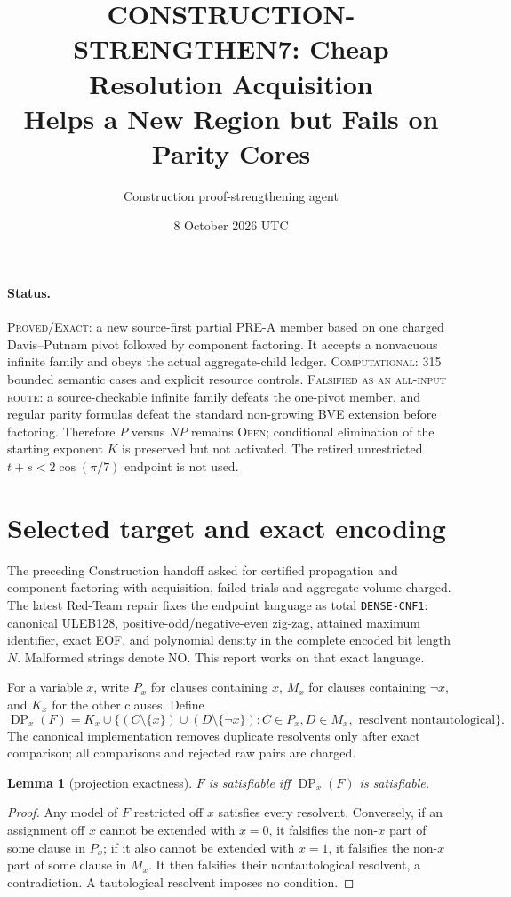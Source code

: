 \documentclass[11pt]{article}
\title{CONSTRUCTION-STRENGTHEN7: Cheap Resolution Acquisition\\Helps a New Region but Fails on Parity Cores}
\author{Construction proof-strengthening agent}
\date{8 October 2026 UTC}
\newtheorem{lemma}[theorem]{Lemma}
\begin{document}
\sloppy\maketitle

\paragraph{Status.}
\textsc{Proved/Exact}: a new source-first partial PRE-A member based on one
charged Davis--Putnam pivot followed by component factoring.  It accepts a
nonvacuous infinite family and obeys the actual aggregate-child ledger.
\textsc{Computational}: 315 bounded semantic cases and explicit resource
controls.  \textsc{Falsified as an all-input route}: a source-checkable
infinite family defeats the one-pivot member, and regular parity formulas
defeat the standard non-growing BVE extension before factoring.  Therefore
$P$ versus $NP$ remains \textsc{Open}; conditional elimination of the
starting exponent $K$ is preserved but not activated.  The retired
unrestricted $t+s<2\cos(\pi/7)$ endpoint is not used.

\section{Selected target and exact encoding}

The preceding Construction handoff asked for certified propagation and
component factoring with acquisition, failed trials and aggregate volume
charged.  The latest Red-Team repair fixes the endpoint language as total
\texttt{DENSE-CNF1}: canonical ULEB128, positive-odd/negative-even zig-zag,
attained maximum identifier, exact EOF, and polynomial density in the
complete encoded bit length $N$.  Malformed strings denote NO.  This report
works on that exact language.

For a variable $x$, write $P_x$ for clauses containing $x$, $M_x$ for
clauses containing $\neg x$, and $K_x$ for the other clauses.  Define
\[
 \operatorname{DP}_x(F)=K_x\cup
 \{(C\setminus\{x\})\cup(D\setminus\{\neg x\}):
 C\in P_x,D\in M_x,\text{ resolvent nontautological}\}.       \tag{1}
\]
The canonical implementation removes duplicate resolvents only after exact
comparison; all comparisons and rejected raw pairs are charged.

\begin{lemma}[projection exactness]\label{lem:dp}
$F$ is satisfiable iff $\operatorname{DP}_x(F)$ is satisfiable.
\end{lemma}
\begin{proof}
Any model of $F$ restricted off $x$ satisfies every resolvent.  Conversely,
if an assignment off $x$ cannot be extended with $x=0$, it falsifies the
non-$x$ part of some clause in $P_x$; if it also cannot be extended with
$x=1$, it falsifies the non-$x$ part of some clause in $M_x$.  It then
falsifies their nontautological resolvent, a contradiction.  A tautological
resolvent imposes no condition.
\end{proof}
\end{document}
